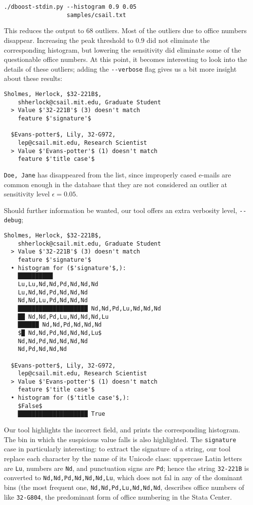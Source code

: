\begin{lstlisting}[gobble=2]
./dboost-stdin.py --histogram 0.9 0.05 
                  samples/csail.txt
\end{lstlisting}

This reduces the output to $68$ outliers. Most of the outliers due to office numbers disappear. Increasing the peak threshold to $0.9$ did not eliminate the corresponding histogram, but lowering the sensitivity did eliminate some of the questionable office numbers. At this point, it becomes interesting to look into the details of these outliers; adding the \lstinline{--verbose} flag gives us a bit more insight about these results:

\begin{lstlisting}[gobble=2]
  Sholmes, Herlock, $32-221B$, 
    shherlock@csail.mit.edu, Graduate Student
  > Value $'32-221B'$ (3) doesn't match 
    feature $'signature'$
 
  $Evans-potter$, Lily, 32-G972, 
    lep@csail.mit.edu, Research Scientist
  > Value $'Evans-potter'$ (1) doesn't match 
    feature $'title case'$  
\end{lstlisting}

\lstinline{Doe, Jane} has disappeared from the list, since improperly cased e-mails are common enough in the database that they are not considered an outlier at sensitivity level $\epsilon = 0.05$.
 
Should further information be wanted, our tool offers an extra verbosity level, \lstinline{--debug};

\begin{lstlisting}[gobble=2]
  Sholmes, Herlock, $32-221B$, 
    shherlock@csail.mit.edu, Graduate Student
  > Value $'32-221B'$ (3) doesn't match 
    feature $'signature'$
  • histogram for ($'signature'$,):
    ██████████ 
    Lu,Lu,Nd,Nd,Pd,Nd,Nd,Nd
    Lu,Nd,Nd,Pd,Nd,Nd,Nd
    Nd,Nd,Lu,Pd,Nd,Nd,Nd
    ████████████████████ Nd,Nd,Pd,Lu,Nd,Nd,Nd
    ██ Nd,Nd,Pd,Lu,Nd,Nd,Nd,Lu
    ██████ Nd,Nd,Pd,Nd,Nd,Nd
    $█ Nd,Nd,Pd,Nd,Nd,Nd,Lu$
    Nd,Nd,Pd,Nd,Nd,Nd,Nd
    Nd,Pd,Nd,Nd,Nd

  $Evans-potter$, Lily, 32-G972, 
    lep@csail.mit.edu, Research Scientist
  > Value $'Evans-potter'$ (1) doesn't match 
    feature $'title case'$  
  • histogram for ($'title case'$,):
    $False$
    ████████████████████ True
\end{lstlisting}

Our tool highlights the incorrect field, and prints the corresponding histogram. The bin in which the suspicious value falls is also highlighted. The \lstinline{signature} case in particularly interesting: to extract the signature of a string, our tool replace each character by the name of its Unicode class: uppercase Latin letters are \lstinline{Lu}, numbers are \lstinline{Nd}, and punctuation signs are \lstinline{Pd}; hence the string \lstinline{32-221B} is converted to \lstinline{Nd,Nd,Pd,Nd,Nd,Nd,Lu}, which does not fal in any of the dominant bins (the most frequent one, \lstinline{Nd,Nd,Pd,Lu,Nd,Nd,Nd}, describes office numbers of like \lstinline{32-G804}, the predominant form of office numbering in the Stata Center.  


